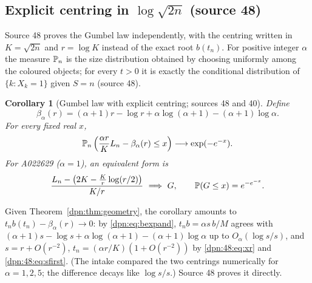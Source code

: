 \documentclass[11pt]{article}
\numberwithin{equation}{section}
\newtheorem{corollary}[theorem]{Corollary}
\theoremstyle{definition}\newtheorem{definition}[theorem]{Definition}
\theoremstyle{remark}\newtheorem{remark}[theorem]{Remark}
\newcommand{\src}[1]{\textup{(source #1)}}
\begin{document}
\subsection{Explicit centring in \texorpdfstring{$\log\sqrt{2n}$}{log sqrt(2n)} \src{48}}\label{dpn:48:sec:gumbel}
Source 48 proves the Gumbel law independently, with the centring written in
$K=\sqrt{2n}$ and $r=\log K$ instead of the exact root $b(t_n)$.  For positive
integer $\alpha$ the measure $\mathbb P_n$ is the size distribution obtained by
choosing uniformly among the coloured objects; for every $t>0$ it is exactly
the conditional distribution of $\{k:X_k=1\}$ given $S=n$ \src{48}.

\begin{corollary}[Gumbel law with explicit centring; sources 48 and 40]\label{dpn:48:thm:gumbel}
Define
\begin{equation}\label{dpn:48:eq:centering}
 \beta_\alpha(r)=(\alpha+1)r-\log r+\alpha\log(\alpha+1)-(\alpha+1)\log\alpha.
\end{equation}
For every fixed real $x$,
\begin{equation}\label{dpn:48:eq:gumbel}
 \mathbb P_n\left(\frac{\alpha r}{K}L_n-\beta_\alpha(r)\le x\right)
                 \longrightarrow\exp(-e^{-x}).
\end{equation}
For A022629 ($\alpha=1$), an equivalent form is
\begin{equation}\label{dpn:48:eq:gumbels1}
 \frac{L_n-\left(2K-\frac{K}{r}\log(r/2)\right)}{K/r}
                  \ \Longrightarrow\ G,
 \qquad \mathbb P(G\le x)=e^{-e^{-x}}.
\end{equation}
\end{corollary}
Given Theorem~\ref{dpn:thm:geometry}, the corollary amounts to
$t_nb(t_n)-\beta_\alpha(r)\to0$: by \eqref{dpn:eq:bexpand},
$t_nb=\alpha s\,b/M$ agrees with
$(\alpha+1)s-\log s+\alpha\log(\alpha+1)-(\alpha+1)\log\alpha$ up to
$O_\alpha(\log s/s)$, and $s=r+O(r^{-2})$, $t_n=(\alpha r/K)(1+O(r^{-2}))$ by
\eqref{dpn:48:eq:xr} and \eqref{dpn:48:eq:sfirst}.  (The intake compared the
two centrings numerically for $\alpha=1,2,5$; the difference decays like
$\log s/s$.)  Source 48 proves it directly.
\end{document}
